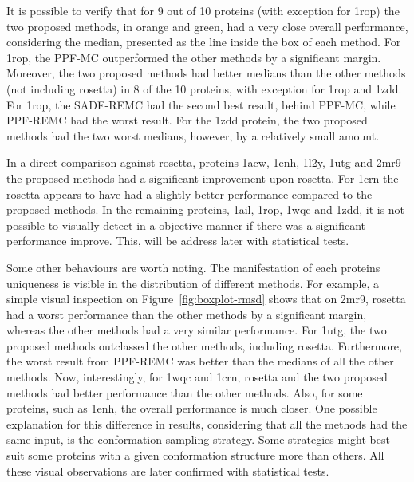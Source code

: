 It is possible to verify that for 9 out of 10 proteins (with exception for 1rop) the
two proposed methods, in orange and green, had a very close overall performance,
considering the median, presented as the line inside the box of each method.
For 1rop, the PPF-MC outperformed the other methods by a significant margin.
Moreover, the two proposed methods had better medians than
the other methods (not including rosetta) in 8 of the 10 proteins,
with exception for 1rop and 1zdd.
For 1rop, the SADE-REMC had the second best result, behind PPF-MC, while PPF-REMC
had the worst result.
For the 1zdd protein, the two proposed methods had the two worst
medians, however, by a relatively small amount.

In a direct comparison against rosetta, proteins 1acw, 1enh, 1l2y, 1utg and 2mr9
the proposed methods had a significant improvement upon rosetta.
For 1crn the rosetta appears to have had
a slightly better performance compared to the proposed methods.
In the remaining proteins, 1ail, 1rop, 1wqc and 1zdd, it is not
possible to visually detect in a objective manner if there was
a significant performance improve. This, will be address later with statistical
tests.

Some other behaviours are worth noting. The manifestation of each
proteins uniqueness is visible in the distribution of different methods. For example,
a simple visual inspection on Figure~\ref{fig:boxplot-rmsd} shows that on
2mr9, rosetta had a worst performance than the other methods by a significant margin,
whereas the other methods had a very similar performance. For 1utg, the two proposed
methods outclassed the other methods, including rosetta. Furthermore, the worst
result from PPF-REMC was better than the medians of all the other methods.
Now, interestingly, for 1wqc and 1crn, rosetta and the two proposed methods had
better performance than the other methods. Also, for some proteins, such as 1enh,
the overall performance is much closer. One possible explanation for this difference
in results, considering that all the methods had the same input, is the conformation
sampling strategy. Some strategies might best suit some proteins with a given conformation
structure more than others. All these visual observations are later confirmed with
statistical tests.

